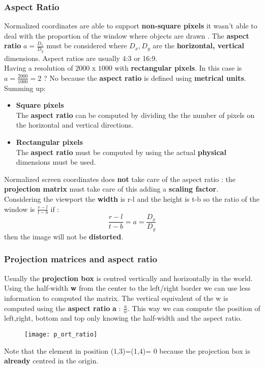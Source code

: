 \subsubsection{Aspect Ratio}
Normalized coordinates are able to support \textbf{non-square pixels} it wasn't able to deal with the proportion of the window where objects are drawn .
The \textbf{aspect ratio } $a = \frac{D_x}{D_y}$ must be considered where $D_x ,D_y$ are the \textbf{horizontal, vertical} dimensions. Aspect ratios are usually 4:3 or 16:9.\\
Having a resolution of $2000$ x $1000$ with \textbf{rectangular pixels}. In this case is $a = \frac{2000}{1000} = 2$ ? No because the \textbf{aspect ratio} is defined using \textbf{metrical units}. Summing up:
\begin{itemize}
\item\textbf{Square pixels}\\
The \textbf{aspect ratio} can be computed by dividing the the number of pixels on the horizontal and vertical directions.
\item\textbf{Rectangular pixels}\\
The \textbf{aspect ratio} must be computed by using the actual \textbf{physical} dimensions must be used.
\end{itemize}
Normalized screen coordinates does \textbf{not} take care of the aspect ratio : 
the \textbf{projection matrix } must take care of this adding a \textbf{scaling factor}.\\
Considering the viewport the \textbf{width} is r-l and the height is t-b so the ratio of the window is $ \frac{r-l}{t-b}$ if : 
$$\frac{r-l}{t-b} = a =\frac{D_x}{D_y} $$ 
then the image will not be \textbf{distorted}. 

\subsubsection{Projection matrices and aspect ratio}
Usually the \textbf{projection box} is centred vertically and horizontally in the world. Using the half-width \textbf{w} from the center to the left/right border we can use less information to computed the matrix. The vertical equivalent of the w is computed using the \textbf{aspect ratio} \textbf{a} : $\frac{a}{w}$.
This way we can compute the position of left,right, bottom and top only knowing the half-width and the aspect ratio.
\begin{figure}[H]
 \centering
  \texttt{[image: p\_ort\_ratio]}
\end{figure}
Note that the element in position (1,3)=(1,4)= 0 because the projection box is \textbf{already} centred in the origin.
 